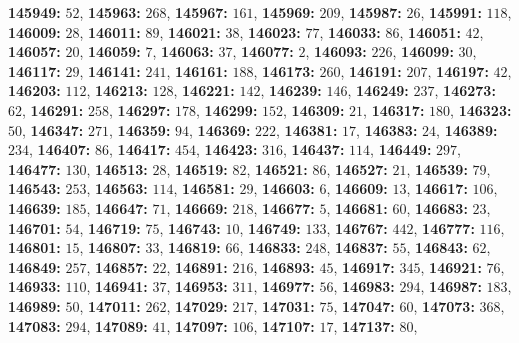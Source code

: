 \textsf{\bfseries 145949:} $52$, \textsf{\bfseries 145963:} $268$, \textsf{\bfseries 145967:} $161$, \textsf{\bfseries 145969:} $209$, \textsf{\bfseries 145987:} $26$, \textsf{\bfseries 145991:} $118$, \textsf{\bfseries 146009:} $28$, \textsf{\bfseries 146011:} $89$, \textsf{\bfseries 146021:} $38$, \textsf{\bfseries 146023:} $77$, \textsf{\bfseries 146033:} $86$, \textsf{\bfseries 146051:} $42$, \textsf{\bfseries 146057:} $20$, \textsf{\bfseries 146059:} $7$, \textsf{\bfseries 146063:} $37$, \textsf{\bfseries 146077:} $2$, \textsf{\bfseries 146093:} $226$, \textsf{\bfseries 146099:} $30$, \textsf{\bfseries 146117:} $29$, \textsf{\bfseries 146141:} $241$, \textsf{\bfseries 146161:} $188$, \textsf{\bfseries 146173:} $260$, \textsf{\bfseries 146191:} $207$, \textsf{\bfseries 146197:} $42$, \textsf{\bfseries 146203:} $112$, \textsf{\bfseries 146213:} $128$, \textsf{\bfseries 146221:} $142$, \textsf{\bfseries 146239:} $146$, \textsf{\bfseries 146249:} $237$, \textsf{\bfseries 146273:} $62$, \textsf{\bfseries 146291:} $258$, \textsf{\bfseries 146297:} $178$, \textsf{\bfseries 146299:} $152$, \textsf{\bfseries 146309:} $21$, \textsf{\bfseries 146317:} $180$, \textsf{\bfseries 146323:} $50$, \textsf{\bfseries 146347:} $271$, \textsf{\bfseries 146359:} $94$, \textsf{\bfseries 146369:} $222$, \textsf{\bfseries 146381:} $17$, \textsf{\bfseries 146383:} $24$, \textsf{\bfseries 146389:} $234$, \textsf{\bfseries 146407:} $86$, \textsf{\bfseries 146417:} $454$, \textsf{\bfseries 146423:} $316$, \textsf{\bfseries 146437:} $114$, \textsf{\bfseries 146449:} $297$, \textsf{\bfseries 146477:} $130$, \textsf{\bfseries 146513:} $28$, \textsf{\bfseries 146519:} $82$, \textsf{\bfseries 146521:} $86$, \textsf{\bfseries 146527:} $21$, \textsf{\bfseries 146539:} $79$, \textsf{\bfseries 146543:} $253$, \textsf{\bfseries 146563:} $114$, \textsf{\bfseries 146581:} $29$, \textsf{\bfseries 146603:} $6$, \textsf{\bfseries 146609:} $13$, \textsf{\bfseries 146617:} $106$, \textsf{\bfseries 146639:} $185$, \textsf{\bfseries 146647:} $71$, \textsf{\bfseries 146669:} $218$, \textsf{\bfseries 146677:} $5$, \textsf{\bfseries 146681:} $60$, \textsf{\bfseries 146683:} $23$, \textsf{\bfseries 146701:} $54$, \textsf{\bfseries 146719:} $75$, \textsf{\bfseries 146743:} $10$, \textsf{\bfseries 146749:} $133$, \textsf{\bfseries 146767:} $442$, \textsf{\bfseries 146777:} $116$, \textsf{\bfseries 146801:} $15$, \textsf{\bfseries 146807:} $33$, \textsf{\bfseries 146819:} $66$, \textsf{\bfseries 146833:} $248$, \textsf{\bfseries 146837:} $55$, \textsf{\bfseries 146843:} $62$, \textsf{\bfseries 146849:} $257$, \textsf{\bfseries 146857:} $22$, \textsf{\bfseries 146891:} $216$, \textsf{\bfseries 146893:} $45$, \textsf{\bfseries 146917:} $345$, \textsf{\bfseries 146921:} $76$, \textsf{\bfseries 146933:} $110$, \textsf{\bfseries 146941:} $37$, \textsf{\bfseries 146953:} $311$, \textsf{\bfseries 146977:} $56$, \textsf{\bfseries 146983:} $294$, \textsf{\bfseries 146987:} $183$, \textsf{\bfseries 146989:} $50$, \textsf{\bfseries 147011:} $262$, \textsf{\bfseries 147029:} $217$, \textsf{\bfseries 147031:} $75$, \textsf{\bfseries 147047:} $60$, \textsf{\bfseries 147073:} $368$, \textsf{\bfseries 147083:} $294$, \textsf{\bfseries 147089:} $41$, \textsf{\bfseries 147097:} $106$, \textsf{\bfseries 147107:} $17$, \textsf{\bfseries 147137:} $80$, 
